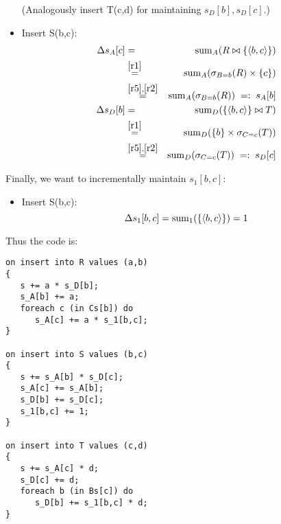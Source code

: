 \begin{example}
\begin{itemize}
(Analogously insert T(c,d) for maintaining $s_{D}[b], s_{D}[c]$.)

\item
Insert S(b,c):
\begin{eqnarray*}
\Delta s_A[c] &=&
\mathrm{sum}_{A}(R \bowtie \{{\langle b,c\rangle}\})
\\ &\stackrel{\ref{r1}}{=}&
\mathrm{sum}_{A}(\sigma_{B=b}(R) \times \{c\})
\\ &\stackrel{\ref{r5},\ref{r2}}{=}&
\mathrm{sum}_{A}(\sigma_{B=b}(R))
\;=:\; s_A[b]
\\
\Delta s_D[b] &=&
\mathrm{sum}_{D}(\{{\langle b,c\rangle}\} \bowtie T)
\\ &\stackrel{\ref{r1}}{=}&
\mathrm{sum}_{D}(\{b\} \times \sigma_{C=c}(T))
\\ &\stackrel{\ref{r5},\ref{r2}}{=}&
\mathrm{sum}_{D}(\sigma_{C=c}(T))
\;=:\; s_D[c]
\end{eqnarray*}
\end{itemize}

Finally, we want to incrementally maintain $s_1[b,c]$:
\begin{itemize}
\item
Insert S(b,c):
\[
\Delta s_1[b,c] =
\mathrm{sum}_{1}(\{{\langle b,c\rangle}\}) = 1
\]
\end{itemize}

Thus the code is:
\begin{verbatim}
on insert into R values (a,b)
{
   s += a * s_D[b];
   s_A[b] += a;
   foreach c (in Cs[b]) do
      s_A[c] += a * s_1[b,c];
}

on insert into S values (b,c)
{
   s += s_A[b] * s_D[c];
   s_A[c] += s_A[b];
   s_D[b] += s_D[c];
   s_1[b,c] += 1;
}

on insert into T values (c,d)
{
   s += s_A[c] * d;
   s_D[c] += d;
   foreach b (in Bs[c]) do
      s_D[b] += s_1[b,c] * d;
}
\end{verbatim}
\punto
\end{example}


